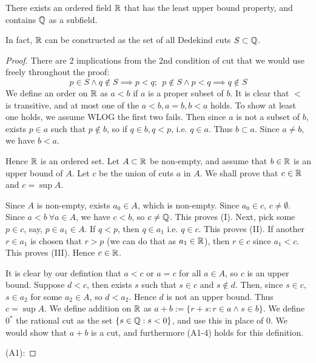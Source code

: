 \documentclass[11pt]{article}
\begin{document}
\begin{theorem}
  There exists an ordered field \(\mathbb{R}\) that has the least upper bound property, and contains \(\mathbb{Q}\) as a subfield.

  In fact, \(\mathbb{R}\) can be constructed as the set of all Dedekind cuts \(S\subset\mathbb{Q}\).
\end{theorem}
\begin{proof}
  There are 2 implications from the 2nd condition of cut that we would use freely throughout the proof: \[p\in S \land q\notin S \implies p<q; \:\:p\notin S \land p<q \implies q \notin S\]
  We define an order on \(\mathbb{R}\) as \(a<b\) if \(a\) is a proper subset of \(b\). It is clear that \(<\) is transitive, and at most one of the \(a<b,a=b,b<a\) holds. To show at least one holds, we assume WLOG the first two fails. Then since \(a\) is not a subset of \(b\), exists \(p\in a\) such that \(p\notin b\), so if \(q\in b, q<p\), i.e. \(q\in a\). Thus \(b\subset a\). Since \(a\neq b\), we have \(b<a\).

  Hence \(\mathbb{R}\) is an ordered set.
  Let \(A\subset\mathbb{R}\) be non-empty, and assume that \(b \in\mathbb{R}\) is an upper bound of \(A\). Let \(c\) be the union of cuts \(a\) in \(A\). We shall prove that \(c\in\mathbb{R}\) and \(c=\sup A\).

  Since \(A\) is non-empty, exists \(a_0\in A\), which is non-empty. Since \(a_0\in c\), \(c\neq\emptyset\). Since \(a<b \: \forall a\in A\), we have \(c<b\), so \(c\neq\mathbb{Q}\). This proves (I). Next, pick some \(p\in c\), say, \(p\in a_1\in A\). If \(q<p\), then \(q\in a_1\) i.e. \(q\in c\). This proves (II). If another \(r\in a_1\) is chosen that \(r>p\) (we can do that as \(a_1\in\mathbb{R}\)), then \(r\in c\) since \(a_1<c\). This proves (III). Hence \(c\in\mathbb{R}\).

  It is clear by our defintion that \(a<c\) or \(a=c\) for all \(a\in A\), so \(c\) is an upper bound. Suppose \(d<c\), then exists \(s\) such that \(s\in c\) and \(s\notin d\). Then, since \(s\in c\), \(s\in a_2\) for some \(a_2\in A\), so \(d <a_2\). Hence \(d\) is not an upper bound. Thus \(c=\sup A\).
  We define addition on \(\mathbb{R}\) as \(a+b:=\{r+s:r\in a\land s \in b\}\). We define \(0^*\) the rational cut as the set \(\{s\in\mathbb{Q}:s<0\}\), and use this in place of \(0\). We would show that \(a+b\) is a cut, and furthermore (A1-4) holds for this definition.

  (A1):%
\end{proof}
\end{document}
